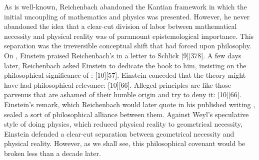 \documentclass[final]{article}
\begin{document}
As is well-known, Reichenbach abandoned the Kantian framework in which the initial uncoupling of mathematics and physics was presented. However, he never abandoned the idea that a clear-cut division of labor between mathematical necessity and physical reality was of paramount epistemological importance. This separation was the irreversible conceptual shift that \rt had forced upon philosophy. On , Einstein praised Reichenbach's  in a letter to Schlick [9][378]. A few days later, Reichenbach asked Einstein to dedicate the book to him, insisting on the philosophical significance of \rt:   [10][57]. Einstein conceded that the theory might have had philosophical relevance:   [10][66]. Alleged \apr principles are like those parvenus that are ashamed of their humble origin and try to deny it:  [10][66]. Einstein's remark, which Reichenbach would later quote in his published writing \citep[354]{Reichenbach1922a}, sealed a sort of philosophical alliance between them. Against Weyl's speculative style of doing physics, which reduced physical reality to geometrical necessity, Einstein defended a clear-cut separation between geometrical necessity and physical reality. However, as we shall see, this philosophical covenant would be broken less than a decade later.

\end{document}
